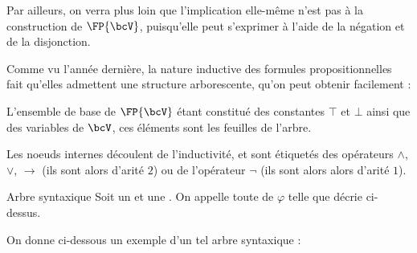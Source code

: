     Par ailleurs, on verra plus loin que l'implication elle-même n'est pas  à la construction de $\FP{\bcV}$, puisqu'elle peut s'exprimer à l'aide de la négation et de la disjonction.\newline
    
    Comme vu l'année dernière, la nature inductive des formules propositionnelles fait qu'elles admettent une structure arborescente, qu'on peut obtenir facilement :
    \begin{enumerate}
        \itt L'ensemble de base de $\FP{\bcV}$ étant constitué des constantes $\top$ et $\bot$ ainsi que des variables de $\bcV$, ces éléments sont les feuilles de l'arbre.
        
        \itt Les noeuds internes découlent de l'inductivité, et sont étiquetés des opérateurs $\land$, $\lor$, $\rightarrow$ (ils sont alors d'arité $2$) ou de l'opérateur $\neg$ (ils sont alors alors d'arité $1$).
    \end{enumerate} 
    \begin{definition}{Arbre syntaxique}{}
        Soit \hg{$\bcV$} un  et \hg{$\varphi \in \FP{\bcV}$} une . On appelle  toute  de $\varphi$ telle que décrie ci-dessus.
    \end{definition}
    
    On donne ci-dessous un exemple d'un tel arbre syntaxique :
    
